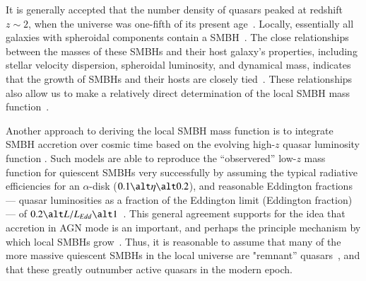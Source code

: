 \documentclass[aps,prd,twocolumn,superscriptaddress,tightenlines,nofootinbib]{revtex4-1}
\begin{document}
It is generally accepted that the number density of quasars peaked at
redshift $z \sim 2$, when the universe was one-fifth of its present
age~\cite{Rees}. Locally, essentially all galaxies with spheroidal
components contain a SMBH~\cite{Richstone:1998ky,Ho:1998hz,Kormendy:2004tc}.  The close
relationships between the masses of these SMBHs and their host
galaxy's properties, including stellar velocity dispersion, spheroidal
luminosity, and dynamical mass, indicates that the growth of SMBHs and
their hosts are closely
tied~\cite{Kormendy:1995er,Magorrian:1997hw,Gebhardt:2000fk,Ferrarese:2000se,Haring:2004hr}. These
relationships also allow us to make a relatively direct determination
of the local SMBH mass
function~\cite{Vika:2009ef,McLure:2003em,Graham:2007qb,Marconi:2003tg,Tamura:2005kc}.



Another approach to deriving the local SMBH mass function is to
integrate SMBH accretion over cosmic time based on the evolving
high-$z$ quasar luminosity function
\cite{Marconi:2003tg,Tamura:2005kc,Soltan:1982vf,Chokshi,
  Small92,Cao:2008pd,Li:2011ik,Shankar:2007zg}. Such models are able
to reproduce the ``observered'' low-$z$ mass function for quiescent
SMBHs very successfully by assuming the typical radiative efficiencies
for an $\alpha$-disk ($0.1\alt \eta \alt 0.2$), and reasonable
Eddington fractions --- quasar luminosities as a fraction of the
Eddington limit (Eddington fraction) --- of $0.2 \alt L/L_{Edd}\alt
1$~\cite{Graham:2007qb,Marconi:2003tg,
  Cao:2008pd,Li:2011ik,Yu:2002sq}. This general agreement supports for
the idea that accretion in AGN mode is an important, and perhaps the
principle mechanism by which local SMBHs grow~\cite{Rees,Small92,Marconi:2003tg,Cao:2008pd}. Thus, it is reasonable
to assume that many of the more massive quiescent SMBHs in the local
universe are "remnant'' quasars~\cite{Rees,Chokshi}, and that these greatly outnumber
active quasars in the modern epoch.
\end{document}
